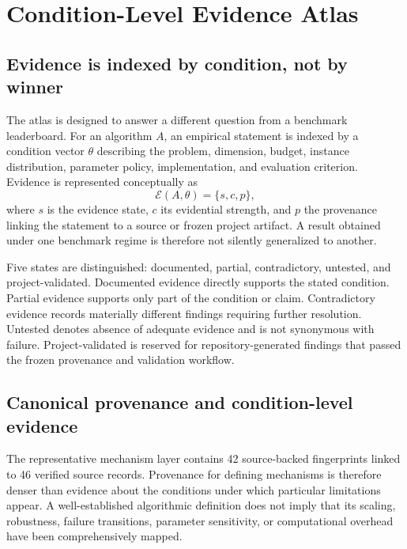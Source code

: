 \section{Condition-Level Evidence Atlas}
\label{sec:evidence-atlas}

\subsection{Evidence is indexed by condition, not by winner}

The atlas is designed to answer a different question from a benchmark leaderboard. For an algorithm \(A\), an empirical statement is indexed by a condition vector \(\theta\) describing the problem, dimension, budget, instance distribution, parameter policy, implementation, and evaluation criterion. Evidence is represented conceptually as
\begin{equation}
\mathcal{E}(A,\theta)=\{s,c,p\},
\label{eq:evidence-state}
\end{equation}
where \(s\) is the evidence state, \(c\) its evidential strength, and \(p\) the provenance linking the statement to a source or frozen project artifact. A result obtained under one benchmark regime is therefore not silently generalized to another.

Five states are distinguished: documented, partial, contradictory, untested, and project-validated. Documented evidence directly supports the stated condition. Partial evidence supports only part of the condition or claim. Contradictory evidence records materially different findings requiring further resolution. Untested denotes absence of adequate evidence and is not synonymous with failure. Project-validated is reserved for repository-generated findings that passed the frozen provenance and validation workflow.

\subsection{Canonical provenance and condition-level evidence}

The representative mechanism layer contains 42 source-backed fingerprints linked to 46 verified source records. Provenance for defining mechanisms is therefore denser than evidence about the conditions under which particular limitations appear. A well-established algorithmic definition does not imply that its scaling, robustness, failure transitions, parameter sensitivity, or computational overhead have been comprehensively mapped.

